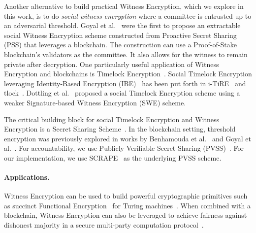 Another alternative to build practical Witness Encryption, which we explore in this work, is to do \emph{social witness encryption} where a committee is entrusted up to an adversarial threshold.
Goyal et al.~\cite{eweb} were the first to propose an extractable social Witness Encryption scheme constructed from Proactive Secret Sharing (PSS) that leverages a blockchain.
The construction can use a Proof-of-Stake blockchain's validators as the committee.
It also allows for the witness to remain private after decryption.
One particularly useful application of Witness Encryption and blockchains is Timelock Encryption~\cite{timelock_puzzles,timelock_from_crc,timed_release_cryptography}.
Social Timelock Encryption leveraging Identity-Based Encryption (IBE)~\cite{ibe} has been put forth in i-TiRE~\cite{i-TiRE} and tlock~\cite{tlock}.
Dottling et al.~\cite{mcfly} proposed a social Timelock Encryption scheme using a weaker Signature-based Witness Encryption (SWE) scheme.

The critical building block for social Timelock Encryption and Witness Encryption is a Secret Sharing Scheme~\cite{shamir_ss}. In the blockchain setting, threshold encryption was previously explored in works by Benhamouda et al.~\cite{benhamouda_ecpss} and Goyal et al.~\cite{eweb}.
For accountability, we use Publicly Verifiable Secret Sharing (PVSS)~\cite{first_pvss_chor,pvss_stadler}.
For our implementation, we use SCRAPE~\cite{pvss_scrape} as the underlying PVSS scheme.

\paragraph{Applications.}
Witness Encryption can be used to build powerful cryptographic primitives such as succinct Functional Encryption~\cite{functional_encryption,fe_survey_review} for Turing machines~\cite{turing_machine_fe}.
When combined with a blockchain, Witness Encryption can also be leveraged to achieve fairness against dishonest majority in a secure multi-party computation protocol~\cite{we_mpc_fairness}.